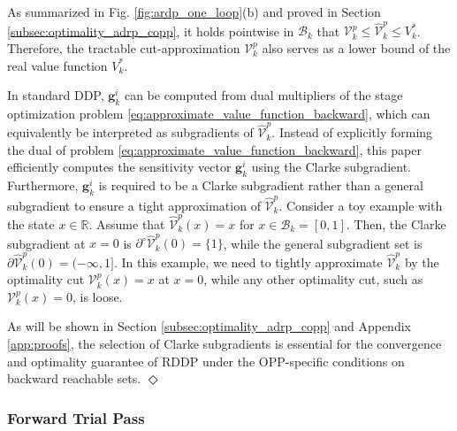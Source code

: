 \documentclass[journal]{IEEEtran}
\theoremstyle{definition}
\theoremstyle{definition}
\newtheorem*{remark}{Remark}
\let\oldremark\remark
\let\endoldremark\endremark
\renewenvironment{remark}
  {\oldremark}
  {\hfill$\Diamond$\endoldremark}
\newcommand\R{{\mathbb{R}}}
\renewcommand\vector[1]{\boldsymbol{#1}}
\newcommand\vg{{\vector{g}}}
\begin{document}
As summarized in Fig. \ref{fig:ardp_one_loop}(b) and proved in Section \ref{subsec:optimality_adrp_copp}, it holds pointwise in $\mathcal{B}_k$ that $\mathcal{V}_k^p\leq \widehat{\mathcal{V}}_k^p\leq V_k^*$. Therefore, the tractable cut-approximation $\mathcal{V}_k^p$ also serves as a lower bound of the real value function $V_k^*$.

\begin{remark}
    In standard DDP, $\vg_k^i$ can be computed from dual multipliers of the stage optimization problem \eqref{eq:approximate_value_function_backward}, which can equivalently be interpreted as subgradients of $\widehat{\mathcal{V}}_k^p$. Instead of explicitly forming the dual of problem \eqref{eq:approximate_value_function_backward}, this paper efficiently computes the sensitivity vector $\vg_k^i$ using the Clarke subgradient. Furthermore, $\vg_k^i$ is required to be a Clarke subgradient rather than a general subgradient to ensure a tight approximation of $\widehat{\mathcal{V}}_k^p$. Consider a toy example with the state $x\in\R$. Assume that $\widehat{\mathcal{V}}_k^p(x)=x$ for $x\in\mathcal{B}_k=[0,1]$. Then, the Clarke subgradient at $x=0$ is $\partial^\circ\widehat{\mathcal{V}}_k^p(0)=\{1\}$, while the general subgradient set is $\partial\widehat{\mathcal{V}}_k^p(0)=(-\infty,1]$. In this example, we need to tightly approximate $\widehat{\mathcal{V}}_k^p$ by the optimality cut $\mathcal{V}_k^p(x)=x$ at $x=0$, while any other optimality cut, such as $\mathcal{V}_k^p(x)=0$, is loose.

    As will be shown in Section \ref{subsec:optimality_adrp_copp} and Appendix \ref{app:proofs}, the selection of Clarke subgradients is essential for the convergence and optimality guarantee of RDDP under the OPP-specific conditions on backward reachable sets.
\end{remark}

\subsubsection{Forward Trial Pass}\label{sub2sec:refinement}
\end{document}
